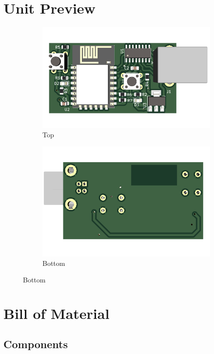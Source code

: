 \documentclass[a4paper,12pt,oneside,pdflatex,italian,final,twocolumn]{article}
\begin{document}
	\section{Unit Preview}
	\begin{figure}[h]
		\centering
		\begin{subfigure}{0.45\textwidth}
			\includegraphics[width=\textwidth]{images/top.png}
			\caption{Top}
		\end{subfigure}
		\begin{subfigure}{0.45\textwidth}
			\includegraphics[width=\textwidth]{images/bottom.png}
			\caption{Bottom}
		\end{subfigure}
	\end{figure}

	\section{Bill of Material}
	
	\subsection{Components}
	
\end{document}
